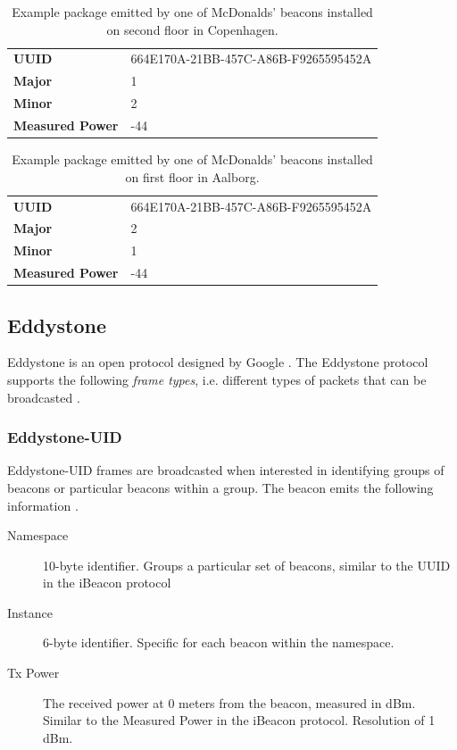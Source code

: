 \begin{table}[h!]
\centering
\caption{Example package emitted by one of McDonalds' beacons installed on second floor in Copenhagen.}
\label{tbl:design:ble-positioning:ibeacon2}
\begin{tabular}{ll}
\textbf{UUID}  & 664E170A-21BB-457C-A86B-F9265595452A \\
\textbf{Major} & 1                                    \\
\textbf{Minor} & 2           \\
\textbf{Measured Power} & -44                        
\end{tabular}
\end{table}

\begin{table}[h!]
\centering
\caption{Example package emitted by one of McDonalds' beacons installed on first floor in Aalborg.}
\label{tbl:design:ble-positioning:ibeacon3}
\begin{tabular}{ll}
\textbf{UUID}  & 664E170A-21BB-457C-A86B-F9265595452A \\
\textbf{Major} & 2                                    \\
\textbf{Minor} & 1            \\                        
\textbf{Measured Power} & -44
\end{tabular}
\end{table}

\subsection{Eddystone}

Eddystone is an open protocol designed by Google \cite{estimote:what-is-eddystone}. The Eddystone protocol supports the following \emph{frame types}, i.e. different types of packets that can be broadcasted \cite{eddystone:protocol-spec}.

\subsubsection{Eddystone-UID}

Eddystone-UID frames are broadcasted when interested in identifying groups of beacons or particular beacons within a group. The beacon emits the following information \cite{eddystone:protocol-uid-spec}.

\begin{description}
\item[Namespace] 10-byte identifier. Groups a particular set of beacons, similar to the UUID in the iBeacon protocol
\item[Instance] 6-byte identifier. Specific for each beacon within the namespace.
\item[Tx Power] The received power at 0 meters from the beacon, measured in dBm. Similar to the Measured Power in the iBeacon protocol. Resolution of 1 dBm.
\end{description}

